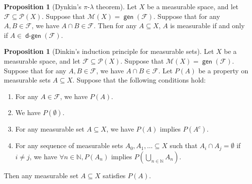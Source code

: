 \documentclass{article}
\theoremstyle{definition}
\newtheorem{proposition}[theorem]{Proposition}
\DeclareMathOperator{\gen}{\mathsf{gen}}
\DeclareMathOperator{\dgen}{\mathsf{d-gen}}
\begin{document}
\begin{proposition}[Dynkin's $\pi$-$\lambda$ theorem]
  Let $X$ be a measurable space, and let $\mathcal{F} \subseteq \mathcal{P}(X)$.
  Suppose that $\mathcal{M}(X) = \gen (\mathcal{F})$.
  Suppose that for any $A, B \in \mathcal{F}$, we have $A \cap B \in \mathcal{F}$.
  Then for any $A \subseteq X$, 
  $A$ is measurable if and only if $A \in \dgen (\mathcal{F})$. 
\end{proposition}

\begin{proposition}[Dinkin's induction principle for measurable sets]
  Let $X$ be a measurable space, 
  and let $\mathcal{F} \subseteq \mathcal{P}(X)$.
  Suppose that $\mathcal{M}(X) = \gen (\mathcal{F})$.
  Suppose that for any $A, B \in \mathcal{F}$, we have $A \cap B \in \mathcal{F}$.
  Let $P(A)$ be a property on measurable sets $A \subseteq X$.
  Suppose that the following conditions hold:
  \begin{enumerate}
    \item For any $A \in \mathcal{F}$, we have $P(A)$.
    \item We have $P(\emptyset)$.
    \item For any measurable set $A \subseteq X$, we have $P(A)$ implies $P(A^c)$.
    \item For any sequence of measurable sets $A_0, A_1, \dots \subseteq X$ 
      such that $A_i \cap A_j = \emptyset$ if $i \neq j$,
      we have $\forall n \in \mathbb{N}, P(A_n)$ implies $P\left(\bigcup_{n \in \mathbb{N}} A_n\right)$.  
  \end{enumerate}
  Then any measurable set $A \subseteq X$ satisfies $P(A)$.
\end{proposition}

\end{document}

